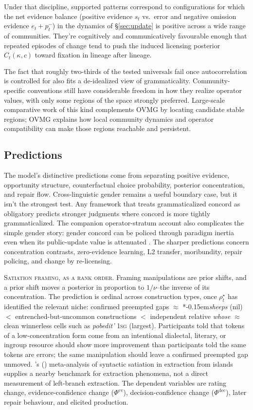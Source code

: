 \documentclass[12pt,letterpaper]{article}
\newcommand{\mention}[1]{\textit{#1}}
\newcommand{\abbr}[1]{\textsc{#1}}
\newcommand{\judgesep}{\kern-0.15em}
\newcommand{\ungram}[1]{*\judgesep#1}
\newcommand{\posscite}[1]{\citeauthor{#1}'s (\citeyear{#1})}
\begin{document}
Under that discipline, supported patterns correspond to configurations for which
the net evidence balance (positive evidence $s_t$ vs.\ error and negative
omission evidence $e_t+p_t^-$) in the dynamics of \S\ref{sec:update} is positive across a wide range
of communities. They're cognitively and communicatively favourable enough that
repeated episodes of change tend to push the induced licensing posterior
$C_t(\kappa,c)$ toward fixation in lineage after lineage.

The fact that roughly two-thirds of the tested universals fail once
autocorrelation is controlled for also fits a de-idealized view of
grammaticality. Community-specific conventions still have considerable freedom
in how they realize operator values, with only some regions of the space strongly
preferred. Large-scale comparative work of this kind complements OVMG by
locating candidate stable regions; OVMG explains how local
community dynamics and operator compatibility can make those regions reachable
and persistent.

\subsection{Predictions}
\label{sec:predictions}

The model's distinctive predictions come from separating positive evidence,
opportunity structure, counterfactual choice probability, posterior
concentration, and repair flow. Cross-linguistic gender remains a useful boundary
case, but it isn't the strongest test. Any framework that treats
grammaticalized concord as obligatory predicts stronger judgments where concord
is more tightly grammaticalized. The companion operator-stratum account also
complicates the simple gender story: gender concord can be policed through
paradigm inertia even when its public-update value is attenuated
\autocite{reynolds2026operators}. The sharper predictions concern concentration
contrasts, zero-evidence learning, L2 transfer, moribundity, repair policing,
and change by re-licensing.

\noindent\textsc{Satiation framing, as a rank order.} Framing manipulations are
prior shifts, and a prior shift moves a posterior in proportion to $1/\nu$--the
inverse of its concentration. The prediction is ordinal across construction
types, once $\rho_t^\star$ has
identified the relevant niche: confirmed preempted gaps $\approx$
\ungram{\mention{sheeps}} (nil) $<$ entrenched-but-uncommon constructions $<$
independent relative \mention{whose} $\approx$ clean winnerless cells such as
\mention{pobedit'} \abbr{1sg} (largest). Participants told that tokens of a
low-concentration form come from an intentional dialectal, literary, or ingroup
resource should show more improvement than participants told the same tokens are
errors; the same manipulation should leave a confirmed preempted gap unmoved.
\posscite{Lu2024} meta-analysis of syntactic satiation in extraction from
islands supplies a nearby benchmark for extraction phenomena, not a direct
measurement of left-branch extraction.
The dependent variables are rating change, evidence-confidence change
($\Phi^{\mathrm{ev}}$), decision-confidence change ($\Phi^{\mathrm{dec}}$),
later repair behaviour, and elicited production.
\end{document}
